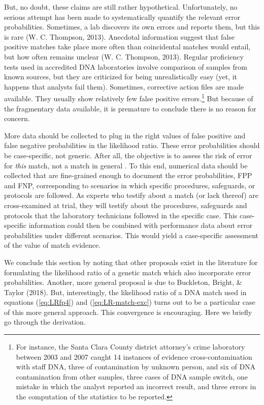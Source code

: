 \documentclass[
  10pt,
  dvipsnames,enabledeprecatedfontcommands]{scrartcl}
\begin{document}
But, no doubt, these claims are still rather hypothetical.
Unfortunately, no serious attempt has been made to systematically
quantify the relevant error probabilities. Sometimes, a lab discovers
its own errors and reports them, but this is rare (W. C. Thompson,
2013). Anecdotal information suggest that false positive matches take
place more often than coincidental matches would entail, but how often
remains unclear (W. C. Thompson, 2013). Regular proficiency tests used
in accredited DNA laboratories involve comparison of samples from known
sources, but they are criticized for being unrealistically easy (yet, it
happens that analysts fail them). Sometimes, corrective action files are
made available. They usually show relatively few false positive
errors.\footnote{For instance, the Santa Clara County district
  attorney's crime laboratory between 2003 and 2007 caught 14 instances
  of evidence cross-contamination with staff DNA, three of contamination
  by unknown person, and six of DNA contamination from other samples,
  three cases of DNA sample switch, one mistake in which the analyst
  reported an incorrect result, and three errors in the computation of
  the statistics to be reported.} But because of the fragmentary data
available, it is premature to conclude there is no reason for concern.

More data should be collected to plug in the right values of false
positive and false negative probabilities in the likelihood ratio. These
error probabilities should be case-specific, not generic. After all, the
objective is to assess the risk of error for \textit{this} match, not a
match in general . To this end, numerical data
should be collected that are fine-grained enough to document the error
probabilities, FPP and FNP, corresponding to scenarios in which specific
procedures, safeguards, or protocols are followed. As experts who
testify about a match (or lack thereof) are cross-examined at trial,
they will testify about the procedures, safeguards and protocols that
the laboratory technicians followed in the specific case. This
case-specific information could then be combined with performance data
about error probabilities under different scenarios. This would yield a
case-specific assessment of the value of match evidence.

We conclude this section by noting that other proposals exist in the
literature for formulating the likelihood ratio of a genetic match which
also incorporate error probabilities. Another, more general proposal is
due to Buckleton, Bright, \& Taylor (2018). But, interestingly, the
likelihood ratio of a DNA match used in equations (\ref{eq:LRfp4}) and
(\ref{eq:LR-match-exc}) turns out to be a particular case of this more
general approach. This convergence is encouraging. Here we briefly go
through the derivation.
\end{document}
